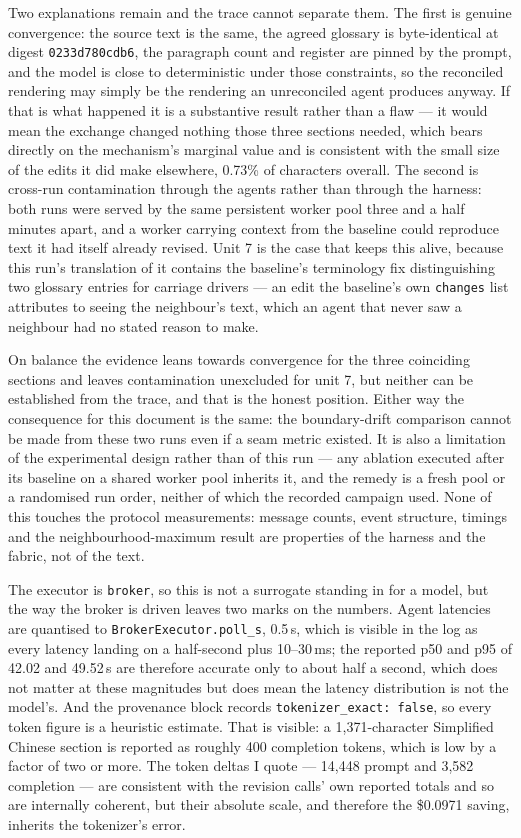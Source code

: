 \documentclass[11pt]{article}
\begin{document}
Two explanations remain and the trace cannot separate them. The first is genuine convergence: the
source text is the same, the agreed glossary is byte-identical at digest \texttt{0233d780cdb6}, the
paragraph count and register are pinned by the prompt, and the model is close to deterministic under
those constraints, so the reconciled rendering may simply be the rendering an unreconciled agent
produces anyway. If that is what happened it is a substantive result rather than a flaw --- it would
mean the exchange changed nothing those three sections needed, which bears directly on the
mechanism's marginal value and is consistent with the small size of the edits it did make elsewhere,
0.73\% of characters overall. The second is cross-run contamination through the agents rather than
through the harness: both runs were served by the same persistent worker pool three and a half
minutes apart, and a worker carrying context from the baseline could reproduce text it had itself
already revised. Unit 7 is the case that keeps this alive, because this run's translation of it contains
the baseline's terminology fix distinguishing two glossary entries for carriage drivers --- an edit
the baseline's own \texttt{changes} list attributes to seeing the neighbour's text, which an agent
that never saw a neighbour had no stated reason to make.

On balance the evidence leans towards convergence for the three coinciding sections and leaves
contamination unexcluded for unit 7, but neither can be established from the trace, and that is the
honest position. Either way the consequence for this document is the same: the boundary-drift
comparison cannot be made from these two runs even if a seam metric existed. It is also a limitation
of the experimental design rather than of this run --- any ablation executed after its baseline on a
shared worker pool inherits it, and the remedy is a fresh pool or a randomised run order, neither of
which the recorded campaign used. None of this touches the protocol measurements: message counts,
event structure, timings and the neighbourhood-maximum result are properties of the harness and the
fabric, not of the text.

The executor is \texttt{broker}, so this is not a surrogate standing in for a model, but the way the
broker is driven leaves two marks on the numbers. Agent latencies are quantised to
\texttt{BrokerExecutor.poll\_s}, 0.5\,s, which is visible in the log as every latency landing on a
half-second plus 10--30\,ms; the reported p50 and p95 of 42.02 and 49.52\,s are therefore accurate
only to about half a second, which does not matter at these magnitudes but does mean the latency
distribution is not the model's. And the provenance block records
\texttt{tokenizer\_exact: false}, so every token figure is a heuristic estimate. That is visible: a
1,371-character Simplified Chinese section is reported as roughly 400 completion tokens, which is
low by a factor of two or more. The token deltas I quote --- 14,448 prompt and 3,582 completion --- are
consistent with the revision calls' own reported totals and so are internally coherent, but their
absolute scale, and therefore the \$0.0971 saving, inherits the tokenizer's error.
\end{document}
